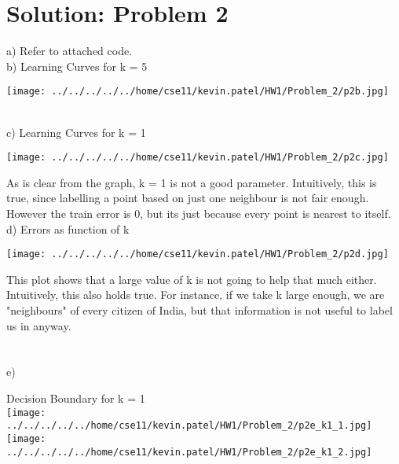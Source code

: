 \documentclass[twoside,10pt,a4paper]{article}
\theoremstyle{definition}
\theoremstyle{definition}
\theoremstyle{remark}
\renewcommand{\>}{{\rightarrow}}
\newcommand{\1}{{\mathbf 1}}
\newcommand{\0}{{\mathbf 0}}
\begin{document}
\section{Solution: Problem 2}
a) Refer to attached code. \\ 
b) Learning Curves for k = 5 \\
\begin{center}
 \texttt{[image: ../../../../../home/cse11/kevin.patel/HW1/Problem\_2/p2b.jpg]}
\end{center}
~\\
c) Learning Curves for k = 1 
\begin{center}
 \texttt{[image: ../../../../../home/cse11/kevin.patel/HW1/Problem\_2/p2c.jpg]}
\end{center}
As is clear from the graph, k = 1 is not a good parameter. Intuitively, this is true, since labelling a point based on just one neighbour is not fair enough. However the train error is 0, but its just because every point is nearest to itself.\\
\linebreak
d) Errors as function of k \\
\begin{center}
 \texttt{[image: ../../../../../home/cse11/kevin.patel/HW1/Problem\_2/p2d.jpg]}
\end{center}
This plot shows that a large value of k is not going to help that much either. Intuitively, this also holds true. For instance, if we take k large enough, we are "neighbours" of every citizen of India, but that information is not useful to label us in anyway.\\ ~\\ ~\\
e)
\begin{center}
Decision Boundary for k = 1 \\
 \texttt{[image: ../../../../../home/cse11/kevin.patel/HW1/Problem\_2/p2e\_k1\_1.jpg]}
\texttt{[image: ../../../../../home/cse11/kevin.patel/HW1/Problem\_2/p2e\_k1\_2.jpg]}
\end{center}
\end{document}
